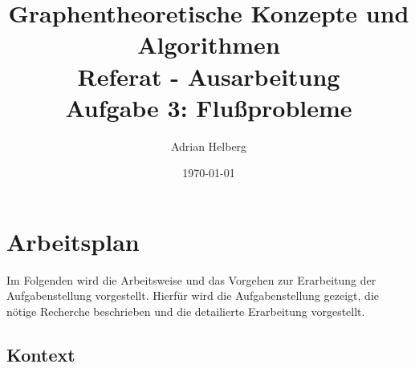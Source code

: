 \documentclass[11pt]{article}
\title{
\Large Graphentheoretische Konzepte und Algorithmen\\
\huge Referat - Ausarbeitung\\
\Large Aufgabe 3: Flu\ss{}probleme\\[0.3in]
}
\author{Adrian Helberg\\}
\date{\today}
\begin{document}
    \maketitle
    \newpage
    \tableofcontents

    \newpage

    \section{Arbeitsplan}
    Im Folgenden wird die Arbeitsweise und das Vorgehen zur Erarbeitung der Aufgabenstellung vorgestellt.
    Hierf\"ur wird die Aufgabenstellung gezeigt, die n\"otige Recherche beschrieben und die detailierte Erarbeitung vorgestellt.

    \subsection{Kontext}
\end{document}
